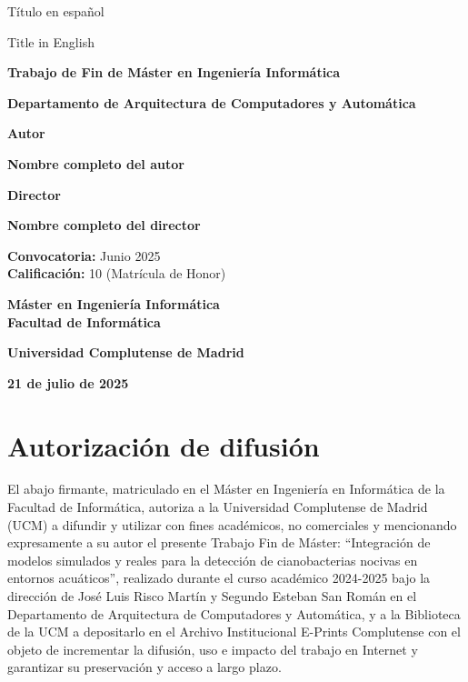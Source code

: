 \documentclass[11pt,a4paper]{book}
\begin{document}
\cleardoublepage
\thispagestyle{empty}

\begin{center}
\vspace*{1cm}

{\Huge {Título en español}} \\
{\Huge {Title in English} \par}

\vspace*{2.5cm}

{\large \textbf{Trabajo de Fin de Máster en Ingeniería Informática}} \\
{\large \textbf{Departamento de Arquitectura de Computadores y Automática} \par}

\vspace{1cm}

{\Large \textbf{Autor}} \\
{\large \textbf{Nombre completo del autor} \par}

\vspace{0.50cm}

{\Large \textbf{Director}} \\
{\large \textbf{Nombre completo del director} \par}

\vspace{0.75cm}\vfill

{\large \textbf{Convocatoria:} Junio 2025}\\
{\large \textbf{Calificación:} 10 (Matrícula de Honor)}

\vspace{1.00cm}\vfill

{\large \textbf{Máster en Ingeniería Informática}}\\
{\large \textbf{Facultad de Informática}}\\
{\large \textbf{Universidad Complutense de Madrid} \par}
{\large \textbf{21 de julio de 2025}}
\end{center}

\cleardoublepage
\thispagestyle{empty}
\chapter*{Autorización de difusión}
El abajo firmante, matriculado en el Máster en Ingeniería en Informática de la Facultad de Informática, autoriza a la Universidad Complutense de Madrid (UCM) a difundir y utilizar con fines académicos, no comerciales y mencionando expresamente a su autor el presente Trabajo Fin de Máster: ``Integración de modelos simulados y reales para la detección de cianobacterias nocivas en entornos acuáticos'', realizado durante el curso académico 2024-2025 bajo la dirección de José Luis Risco Martín y Segundo Esteban San Román en el Departamento de Arquitectura de Computadores y Automática, y a la Biblioteca de la UCM a depositarlo en el Archivo Institucional E-Prints Complutense con el objeto de incrementar la difusión, uso e impacto del trabajo en Internet y garantizar su preservación y acceso a largo plazo.
\end{document}
